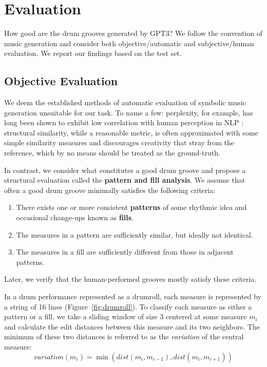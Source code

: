 \documentclass[letterpaper]{article} %
\begin{document}
\section{Evaluation}
How good are the drum grooves generated by GPT3? We follow the convention of music generation and consider both objective/automatic and subjective/human evaluation. We report our findings based on the test set.

\subsection{Objective Evaluation}

We deem the established methods of automatic evaluation of symbolic music generation unsuitable for our task. To name a few: perplexity, for example, has long been shown to exhibit low correlation with human perception in NLP \cite{kuribayashi-etal-2021-lower}; structural similarity, while a reasonable metric, is often approximated with some simple similarity measures \cite{https://doi.org/10.48550/arxiv.2210.10349} and discourages creativity that stray from the reference, which by no means should be treated as the ground-truth.

In contrast, we consider what constitutes a good drum groove and propose a structural evaluation called the \textbf{pattern and fill analysis}. We assume that often a good drum groove minimally satisfies the following criteria:
\begin{enumerate}
\item There exists one or more consistent \textbf{patterns} of some rhythmic idea and occasional change-ups known as \textbf{fills}.
\item The measures in a pattern are sufficiently similar, but ideally not identical.
\item The measures in a fill are sufficiently different from those in adjacent patterns.
\end{enumerate}

Later, we verify that the human-performed grooves mostly satisfy these criteria.

In a drum performance represented as a drumroll, each measure is represented by a string of 16 lines (Figure~\ref{fig:drumroll}). To classify each measure as either a pattern or a fill, we take a sliding window of size 3 centered at some measure $m_i$ and calculate the edit distances between this measure and its two neighbors. The minimum of these two distances is referred to as the \textit{variation} of the central measure:
$$\textit{variation}(m_i) = \min (dist(m_i,m_{i-1}),dist(m_i,m_{i+1}))$$
\end{document}
